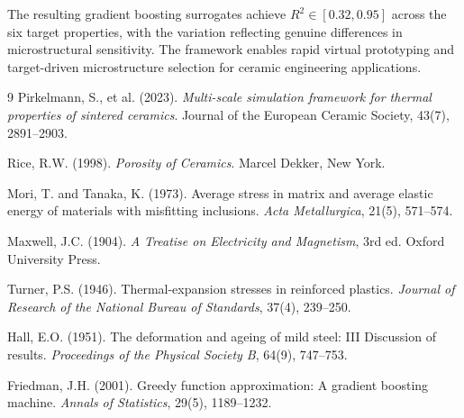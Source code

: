 \documentclass[11pt,a4paper]{article}
\begin{document}
The resulting gradient boosting surrogates achieve $R^2 \in [0.32, 0.95]$ across the six target properties, with the variation reflecting genuine differences in microstructural sensitivity. The framework enables rapid virtual prototyping and target-driven microstructure selection for ceramic engineering applications.

\begin{thebibliography}{9}
Pirkelmann, S., et al. (2023).
\textit{Multi-scale simulation framework for thermal properties of sintered ceramics}.
Journal of the European Ceramic Society, 43(7), 2891--2903.

Rice, R.W. (1998).
\textit{Porosity of Ceramics}.
Marcel Dekker, New York.

Mori, T. and Tanaka, K. (1973).
Average stress in matrix and average elastic energy of materials with misfitting inclusions.
\textit{Acta Metallurgica}, 21(5), 571--574.

Maxwell, J.C. (1904).
\textit{A Treatise on Electricity and Magnetism}, 3rd ed.
Oxford University Press.

Turner, P.S. (1946).
Thermal-expansion stresses in reinforced plastics.
\textit{Journal of Research of the National Bureau of Standards}, 37(4), 239--250.

Hall, E.O. (1951).
The deformation and ageing of mild steel: III Discussion of results.
\textit{Proceedings of the Physical Society B}, 64(9), 747--753.

Friedman, J.H. (2001).
Greedy function approximation: A gradient boosting machine.
\textit{Annals of Statistics}, 29(5), 1189--1232.
\end{thebibliography}
\end{document}
